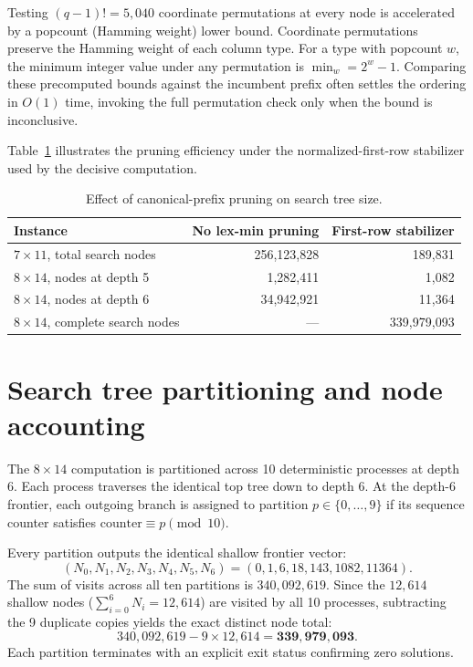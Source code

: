 \documentclass[11pt]{article}
\theoremstyle{plain}
\theoremstyle{definition}
\begin{document}
Testing $(q-1)! = 5{,}040$ coordinate permutations at every node is accelerated by a popcount (Hamming weight) lower bound. Coordinate permutations preserve the Hamming weight of each column type. For a type with popcount $w$, the minimum integer value under any permutation is $\min_w = 2^w - 1$. Comparing these precomputed bounds against the incumbent prefix often settles the ordering in $O(1)$ time, invoking the full permutation check only when the bound is inconclusive.

Table~\ref{tab:pruning} illustrates the pruning efficiency under the normalized-first-row stabilizer used by the decisive computation.

\begin{table}[t]
\centering
\setlength{\tabcolsep}{5pt}
\caption{Effect of canonical-prefix pruning on search tree size.}
\label{tab:pruning}
\begin{tabular}{lrr}
\toprule
Instance & No lex-min pruning & First-row stabilizer\\
\midrule
\(7\times11\), total search nodes & 256,123,828 & 189,831\\
\(8\times14\), nodes at depth 5 & 1,282,411 & 1,082\\
\(8\times14\), nodes at depth 6 & 34,942,921 & 11,364\\
\(8\times14\), complete search nodes & --- & 339,979,093\\
\bottomrule
\end{tabular}
\end{table}

\section{Search tree partitioning and node accounting}\label{sec:partition}

The $8 \times 14$ computation is partitioned across 10 deterministic processes at depth 6. Each process traverses the identical top tree down to depth 6. At the depth-6 frontier, each outgoing branch is assigned to partition $p \in \{0,\dots,9\}$ if its sequence counter satisfies $\text{counter} \equiv p \pmod{10}$.

Every partition outputs the identical shallow frontier vector:
\[
  (N_0, N_1, N_2, N_3, N_4, N_5, N_6) = (0, 1, 6, 18, 143, 1082, 11364).
\]
The sum of visits across all ten partitions is $340{,}092{,}619$. Since the $12{,}614$ shallow nodes ($\sum_{i=0}^6 N_i = 12{,}614$) are visited by all 10 processes, subtracting the 9 duplicate copies yields the exact distinct node total:
\[
  340{,}092{,}619 - 9 \times 12{,}614 = \mathbf{339{,}979{,}093}.
\]
Each partition terminates with an explicit exit status confirming zero solutions.
\end{document}
